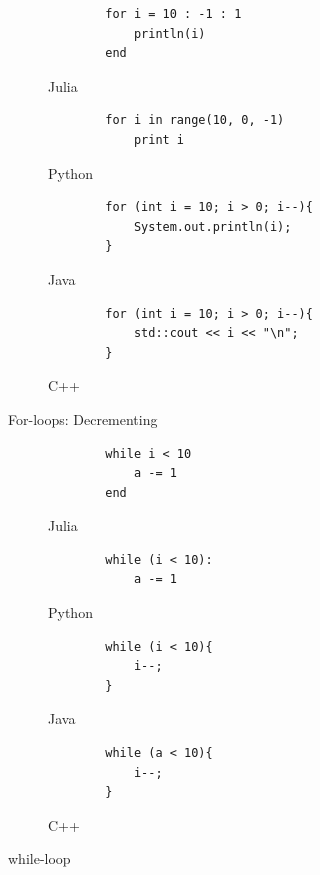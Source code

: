 \documentclass[a4paper, 11pt, titlepage]{article}
\begin{document}
\begin{figure}[H]
	\centering
	\begin{subfigure}[b]{0.7\textwidth}
		\centering
		\begin{lstlisting}
		for i = 10 : -1 : 1
			println(i)
		end
		\end{lstlisting}
		\caption{Julia}
	\end{subfigure}
	\begin{subfigure}[b]{0.7\textwidth}
		\centering
		\begin{lstlisting}
		for i in range(10, 0, -1)
			print i
		\end{lstlisting}
		\caption{Python}
	\end{subfigure}	
	\begin{subfigure}[b]{0.7\textwidth}
		\centering
		\begin{lstlisting}
		for (int i = 10; i > 0; i--){
			System.out.println(i);
		}
		\end{lstlisting}
		\caption{Java}
	\end{subfigure}
	\begin{subfigure}[b]{0.7\textwidth}
		\centering
		\begin{lstlisting}
		for (int i = 10; i > 0; i--){
			std::cout << i << "\n";
		}
		\end{lstlisting}
		\caption{C++}
	\end{subfigure}
	\caption{For-loops: Decrementing}
	\label{forloop-}
\end{figure}

\begin{figure}[H]
	\centering
	\begin{subfigure}[b]{0.7\textwidth}
		\centering
		\begin{lstlisting}
		while i < 10
			a -= 1
		end
		\end{lstlisting}
		\caption{Julia}
	\end{subfigure}
	\begin{subfigure}[b]{0.7\textwidth}
		\centering
		\begin{lstlisting}
		while (i < 10):
			a -= 1
		\end{lstlisting}
		\caption{Python}
	\end{subfigure}	
	\begin{subfigure}[b]{0.7\textwidth}
		\centering
		\begin{lstlisting}
		while (i < 10){
			i--;
		}
		\end{lstlisting}
		\caption{Java}
	\end{subfigure}
	\begin{subfigure}[b]{0.7\textwidth}
		\centering
		\begin{lstlisting}
		while (a < 10){
			i--;
		}
		\end{lstlisting}
		\caption{C++}
	\end{subfigure}
	\caption{while-loop}
	\label{whileloop}
\end{figure}
\end{document}
